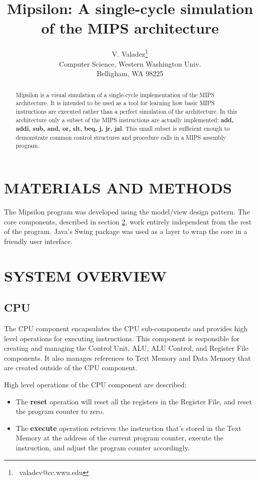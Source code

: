 \documentclass[]{spie}
\title {Mipsilon: A single-cycle simulation\\of the MIPS architecture }
\author {V. Valadez\footnote[1]{ \ valadev@cc.wwu.edu}  \\
          Computer Science, Western Washington Univ.\\
	Belligham, WA 98225
	}
\begin{document}
	\maketitle

\begin{abstract}
Mipsilon is a visual simulation of a single-cycle implementation of the MIPS architecture. It is intended to 
be used as a tool for learning how basic MIPS instructions are executed rather than a perfect simulation of the
architecture. In this architecture only a subset of the MIPS instructions are actually implemented: 
{\bf add, addi, sub, and, or, slt, beq, j, jr, jal}. This small subset is sufficient enough to demonstrate
common control structures and procedure calls in a MIPS assembly program.
\end{abstract}


\section{MATERIALS AND METHODS}
The Mipsilon program was developed using the model/view design pattern.
The core components, described in section \ref{sec:SystemOverview}, work entirely independent from the rest of the program. 
Java's Swing package was used as a layer to wrap the core in a friendly user interface.


\section{SYSTEM OVERVIEW}
\label{sec:SystemOverview}

\subsection{CPU}
The CPU component encapsulates the CPU sub-components and provides high level operations for executing instructions.
This component is responsible for creating and managing the Control Unit, ALU, ALU Control, and Register File components. It also
manages references to Text Memory and Data Memory that are created outside of the CPU component.

High level operations of the CPU component are described:

\begin{itemize}
	\item The {\bf reset} operation will reset all the registers
	in the Register File, and reset the program counter to zero.
	\item The {\bf execute} operation retrieves the instruction that's stored in the Text Memory
	at the address of the current program counter, execute the instruction, and adjust the program counter
	accordingly.
\end{itemize}
\end{document}
